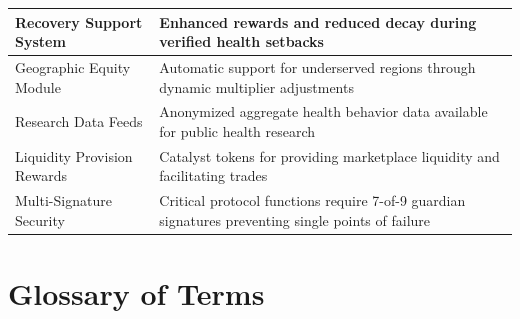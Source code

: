 \documentclass[11pt,letterpaper]{article}
\begin{document}
\begin{longtable}{p{5cm}p{9.5cm}}
Recovery Support System & Enhanced rewards and reduced decay during verified health setbacks \\
\midrule
Geographic Equity Module & Automatic support for underserved regions through dynamic multiplier adjustments \\
\midrule
Research Data Feeds & Anonymized aggregate health behavior data available for public health research \\
\midrule
Liquidity Provision Rewards & Catalyst tokens for providing marketplace liquidity and facilitating trades \\
\midrule
Multi-Signature Security & Critical protocol functions require 7-of-9 guardian signatures preventing single points of failure \\
\bottomrule
\end{longtable}

\section{Glossary of Terms}
\end{document}
